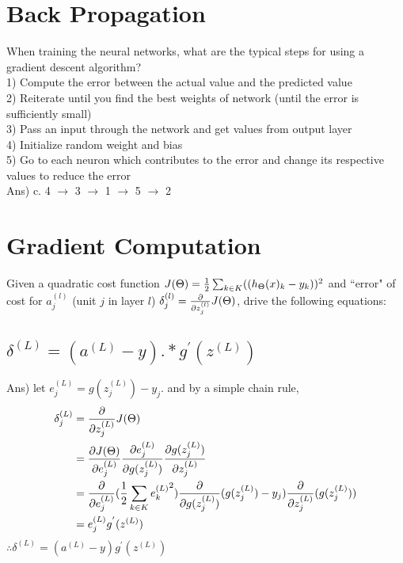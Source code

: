 \documentclass[12pt]{article}%
\begin{document}
\section{Back Propagation}
When training the neural networks, what are the typical steps for using a gradient descent algorithm?\\
1) Compute the error between the actual value and the predicted value\\
2) Reiterate until you find the best weights of network (until the error is sufficiently small)\\
3) Pass an input through the network and get values from output layer\\
4) Initialize random weight and bias\\
5) Go to each neuron which contributes to the error and change its respective values to reduce the error\\

Ans) c. 4 $\rightarrow$ 3 $\rightarrow$ 1 $\rightarrow$ 5 $\rightarrow$ 2

\section{Gradient Computation}
Given a quadratic cost function $J(\Theta) = {1 \over 2} \sum_{k \in K} ((h_\Theta (x)_k - y_k ))^2$ and  ``error" of cost for $a^{(l)}_j$ (unit $j$ in layer $l$) $\delta^{(l)}_j = {\partial \over {\partial z^{(l)}_j}} J(\Theta)$, drive the following equations:
\subsection{$\delta^{(L)} = (a^{(L)} - y).*g^{'}(z^{(L)})$}
Ans) let $e^{(L)}_j = g(z^{(L)}_j) - y_j$. and by a simple chain rule, 
\begin{equation}
	\begin{aligned}
		\delta^{(L)}_j & = {\partial \over {\partial z^{(L)}_j }} J(\Theta) \\
		& = {\partial J(\Theta) \over {\partial e^{(L)}_j }} {\partial e^{(L)}_j \over {\partial g(z^{(L)}_j ) }} {\partial g(z^{(L)}_j ) \over {\partial z^{(L)}_j }} \\
		& = {\partial \over {\partial e^{(L)}_j }} ({1 \over 2} \sum_{k \in K} {e^{(L)}_k}^2 ) {\partial \over {\partial g(z^{(L)}_j )}} ( g(z^{(L)}_j) - y_j) {\partial \over {\partial z^{(L)}_j}} (g(z^{(L)}_j))\\
		& =  e^{(L)}_j g^{'}(z^{(L)})
	\end{aligned}
\end{equation}
$\therefore \delta^{(L)} = (a^{(L)} - y)g^{'}(z^{(L)})$
\end{document}
